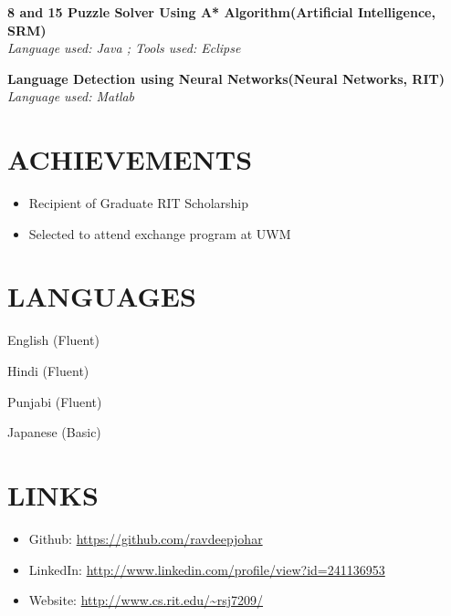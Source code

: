 \documentclass{res}
\begin{document}
\begin{resume}
 {\bf 8 and 15 Puzzle Solver Using A* Algorithm(Artificial Intelligence, SRM) }
\\ \emph{ Language used: Java ; Tools used: Eclipse }

\vspace{-0.1in} 

 {\bf Language Detection using Neural Networks(Neural Networks, RIT) }
\\ \emph{ Language used: Matlab }

\section{ACHIEVEMENTS}



\begin{itemize}
\setlength{\itemsep}{0pt}
\item Recipient of Graduate RIT Scholarship
 \item Selected to attend exchange program at UWM  
 \end {itemize}

\section{LANGUAGES}



\begin{itemize}
\begin{multicols}{2}
\setlength{\itemsep}{0pt}
\item English (Fluent)
 \item Hindi (Fluent)
\item Punjabi (Fluent)
\item Japanese (Basic)

\end{multicols}
\end {itemize}
\section{LINKS}

\begin{itemize}
\setlength{\itemsep}{0pt}

  \item Github: \url{https://github.com/ravdeepjohar}
\item LinkedIn: \url{http://www.linkedin.com/profile/view?id=241136953} 
  \item Website: \url{http://www.cs.rit.edu/~rsj7209/}
\end {itemize}



 

 
\end{resume}
\end{document}
